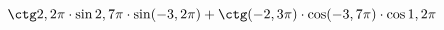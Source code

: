 \begin{ex}[type=calculate]
	\begin{condition}
		\( \ctg2,2\pi\cdot\sin2,7\pi\cdot\sin(-3,2\pi)+\ctg(-2,3\pi)\cdot\cos(-3,7\pi)\cdot\cos1,2\pi \)
	\end{condition}
\end{ex}